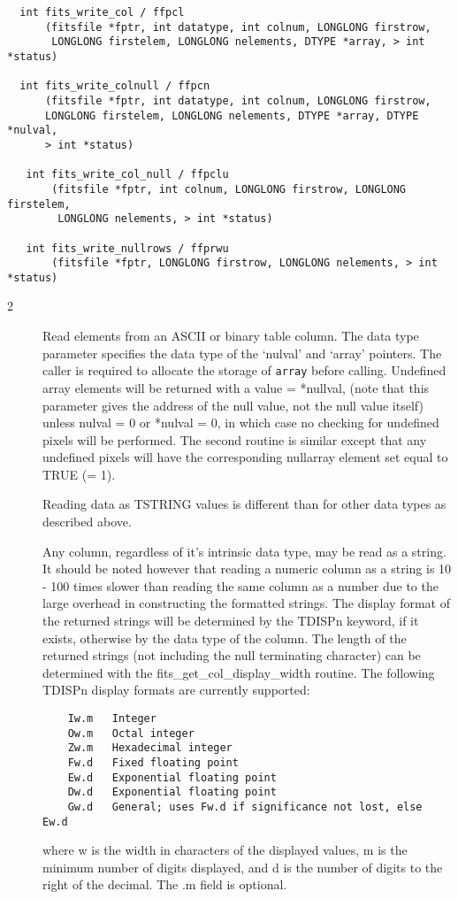 \documentclass[11pt]{book}
\begin{document}
\begin{verbatim}
  int fits_write_col / ffpcl
      (fitsfile *fptr, int datatype, int colnum, LONGLONG firstrow,
       LONGLONG firstelem, LONGLONG nelements, DTYPE *array, > int *status)

  int fits_write_colnull / ffpcn
      (fitsfile *fptr, int datatype, int colnum, LONGLONG firstrow,
      LONGLONG firstelem, LONGLONG nelements, DTYPE *array, DTYPE *nulval,
      > int *status)

   int fits_write_col_null / ffpclu
       (fitsfile *fptr, int colnum, LONGLONG firstrow, LONGLONG firstelem,
        LONGLONG nelements, > int *status)

   int fits_write_nullrows / ffprwu
       (fitsfile *fptr, LONGLONG firstrow, LONGLONG nelements, > int *status)
\end{verbatim}

\begin{description}
\item[2 ] Read elements from an ASCII or binary table column.  The data type
    parameter specifies the data type of the `nulval' and `array'  pointers.
    The caller is required to allocate the storage of \verb+array+ before calling.  
    Undefined array elements will be returned with a value = *nullval,
    (note that this parameter gives the address of the null value, not the
    null value itself) unless nulval = 0 or *nulval = 0, in which case
    no checking for undefined pixels will be performed.  The second
    routine is similar except that any undefined pixels will have the
    corresponding nullarray element set equal to TRUE (= 1).

    Reading data as TSTRING values is different than for other data types
    as described above.

    Any column, regardless of it's intrinsic data type, may be read as a
    string.  It should be noted however that reading a numeric column
    as a string is 10 - 100 times slower than reading the same column
    as a number due to the large overhead in constructing the formatted
    strings.  The display format of the returned strings will be
    determined by the TDISPn keyword, if it exists, otherwise by the
    data type of the column.  The length of the returned strings (not
    including the null terminating character) can be determined with
    the fits\_get\_col\_display\_width routine.  The following TDISPn
    display formats are currently supported:

\begin{verbatim}
    Iw.m   Integer
    Ow.m   Octal integer
    Zw.m   Hexadecimal integer
    Fw.d   Fixed floating point
    Ew.d   Exponential floating point
    Dw.d   Exponential floating point
    Gw.d   General; uses Fw.d if significance not lost, else Ew.d
\end{verbatim}
    where w is the width in characters of the displayed values, m is the minimum
    number of digits displayed, and d is the number of digits to the right of the
    decimal.  The .m field is optional.
   \label{ffgcv} \label{ffgcf}
\end{description}
\end{document}
